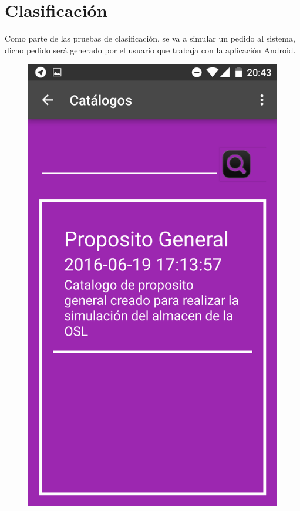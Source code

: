 \documentclass[a4paper,11pt]{book}
\begin{document}
\section{Clasificación}

Como parte de las pruebas de clasificación, se va a simular un pedido al sistema, dicho pedido será generado por el usuario que trabaja con la aplicación Android. 

\begin{figure}[H]
  \includegraphics[width=\linewidth]{imagenes/pruebas/movil/movil9.png}

\end{figure}
\end{document}
